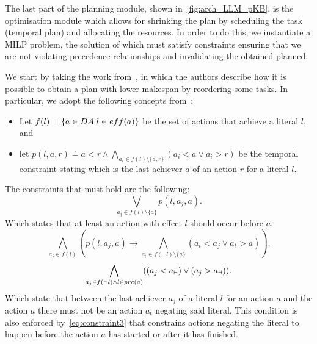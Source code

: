 The last part of the planning module, shown in~\autoref{fig:arch_LLM_pKB}, is the optimisation module which allows for shrinking the plan by scheduling the task (temporal plan) and allocating the resources. In order to do this, we instantiate a MILP problem, the solution of which must satisfy constraints ensuring that we are not violating precedence relationships and invalidating the obtained planned. 

We start by taking the work from~\cite{cimatti_strong_2015}, in which the authors describe how it is possible to obtain a plan with lower makespan by reordering some tasks. In particular, we adopt the following concepts from~\cite{cimatti_strong_2015}:
\begin{itemize}
    \item Let $f(l)=\{a\in DA \vert l\in eff(a)\}$ be the set of actions that achieve a literal $l$, and 
    \item let $\displaystyle p(l,a,r)\doteq a<r \wedge \bigwedge_{a_i\in f(l)\setminus\{a,r\}}(a_i<a\vee a_i>r)$ be the temporal constraint stating which is the last achiever $a$ of an action $r$ for a literal $l$. 
\end{itemize}
The constraints that must hold are the following:
\begin{equation}
    \label{eq:constraint1_old}
    \bigvee_{a_j\in f(l)\setminus\{a\}} p(l,a_j,a).
\end{equation}
Which states that at least an action with effect $l$ should occur before $a$.
\begin{equation}
    \label{eq:constraint2}
    \bigwedge_{a_j\in f(l)} \left(p(l,a_j,a) \rightarrow \bigwedge_{a_t\in f(\lnot l)\setminus\{a\}}(a_t<a_j \vee a_t>a)\right).
\end{equation}
\begin{equation}
    \label{eq:constraint3}
    \bigwedge_{a_j\in f(\lnot l)\wedge l\in \pc{a}} ((a_j<\aStart{a}) \vee (a_j>\aEnd{a})).
\end{equation}
Which state that between the last achiever $a_j$ of a literal $l$ for an action $a$ and the action $a$ there must not be an action $a_t$ negating said literal. This condition is also enforced by~\autoref{eq:constraint3} that constrains actions negating the literal to happen before the action $a$ has started or after it has finished.

